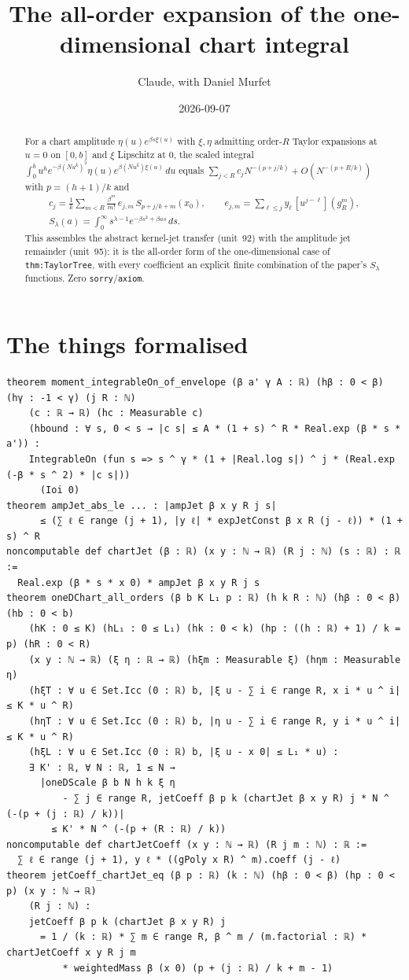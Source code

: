 \documentclass[11pt]{article}
\title{The all-order expansion of the one-dimensional chart integral}
\author{Claude, with Daniel Murfet}
\date{2026-09-07}
\begin{document}
\maketitle
\sloppy

\begin{abstract}
For a chart amplitude $\eta(u)e^{\beta s\xi(u)}$ with $\xi,\eta$ admitting order-$R$ Taylor
expansions at $u=0$ on $[0,b]$ and $\xi$ Lipschitz at $0$, the scaled integral
$\int_0^bu^he^{-\beta(Nu^k)^2}\eta(u)e^{\beta(Nu^k)\xi(u)}\,du$ equals
$\sum_{j<R}c_jN^{-(p+j/k)}+O(N^{-(p+R/k)})$ with $p=(h+1)/k$ and
\begin{gather*}
c_j=\frac1k\sum_{m<R}\frac{\beta^m}{m!}\,e_{j,m}\,S_{p+j/k+m}(x_0),\qquad
e_{j,m}=\sum_{\ell\le j}y_\ell\,[u^{j-\ell}](g_R^m),\\
S_\lambda(a)=\int_0^\infty s^{\lambda-1}e^{-\beta s^2+\beta as}\,ds.
\end{gather*}
This assembles the abstract kernel-jet transfer (unit~92) with the amplitude jet remainder
(unit~95): it is the all-order form of the one-dimensional case of \texttt{thm:TaylorTree}, with
every coefficient an explicit finite combination of the paper's $S_\lambda$ functions. Zero
\texttt{sorry}/\texttt{axiom}.
\end{abstract}

\section{The things formalised}
{\small
\begin{verbatim}
theorem moment_integrableOn_of_envelope (β a' γ A : ℝ) (hβ : 0 < β) (hγ : -1 < γ) (j R : ℕ)
    (c : ℝ → ℝ) (hc : Measurable c)
    (hbound : ∀ s, 0 < s → |c s| ≤ A * (1 + s) ^ R * Real.exp (β * s * a')) :
    IntegrableOn (fun s => s ^ γ * (1 + |Real.log s|) ^ j * (Real.exp (-β * s ^ 2) * |c s|))
      (Ioi 0)
theorem ampJet_abs_le ... : |ampJet β x y R j s|
      ≤ (∑ ℓ ∈ range (j + 1), |y ℓ| * expJetConst β x R (j - ℓ)) * (1 + s) ^ R
noncomputable def chartJet (β : ℝ) (x y : ℕ → ℝ) (R j : ℕ) (s : ℝ) : ℝ :=
  Real.exp (β * s * x 0) * ampJet β x y R j s
theorem oneDChart_all_orders (β b K L₁ p : ℝ) (h k R : ℕ) (hβ : 0 < β) (hb : 0 < b)
    (hK : 0 ≤ K) (hL₁ : 0 ≤ L₁) (hk : 0 < k) (hp : ((h : ℝ) + 1) / k = p) (hR : 0 < R)
    (x y : ℕ → ℝ) (ξ η : ℝ → ℝ) (hξm : Measurable ξ) (hηm : Measurable η)
    (hξT : ∀ u ∈ Set.Icc (0 : ℝ) b, |ξ u - ∑ i ∈ range R, x i * u ^ i| ≤ K * u ^ R)
    (hηT : ∀ u ∈ Set.Icc (0 : ℝ) b, |η u - ∑ i ∈ range R, y i * u ^ i| ≤ K * u ^ R)
    (hξL : ∀ u ∈ Set.Icc (0 : ℝ) b, |ξ u - x 0| ≤ L₁ * u) :
    ∃ K' : ℝ, ∀ N : ℝ, 1 ≤ N →
      |oneDScale β b N h k ξ η
          - ∑ j ∈ range R, jetCoeff β p k (chartJet β x y R) j * N ^ (-(p + (j : ℝ) / k))|
        ≤ K' * N ^ (-(p + (R : ℝ) / k))
noncomputable def chartJetCoeff (x y : ℕ → ℝ) (R j m : ℕ) : ℝ :=
  ∑ ℓ ∈ range (j + 1), y ℓ * ((gPoly x R) ^ m).coeff (j - ℓ)
theorem jetCoeff_chartJet_eq (β p : ℝ) (k : ℕ) (hβ : 0 < β) (hp : 0 < p) (x y : ℕ → ℝ)
    (R j : ℕ) :
    jetCoeff β p k (chartJet β x y R) j
      = 1 / (k : ℝ) * ∑ m ∈ range R, β ^ m / (m.factorial : ℝ) * chartJetCoeff x y R j m
          * weightedMass β (x 0) (p + (j : ℝ) / k + m - 1)
\end{verbatim}
}
\end{document}
